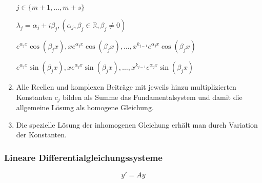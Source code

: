 \documentclass[twoside]{article}
\begin{document}
\begin{enumerate}[1.]
						\begin{math}
							j \in \{ m+1, \dots, m+s\}
						\end{math}
						
						\begin{math}
							\lambda_j = \alpha_j + i \beta_j, (\alpha_j, \beta_j \in \mathbb{R}, \beta_j \neq 0)
						\end{math}
						
						\begin{math}
							e^{\alpha_jx} \cos (\beta_jx), x e^{\alpha_jx} \cos (\beta_jx), \dots, x^{k_{j-1}} e^{\alpha_jx} \cos (\beta_jx)
						\end{math}
						
						\begin{math}
							e^{\alpha_jx} \sin (\beta_jx), x e^{\alpha_jx} \sin (\beta_jx), \dots, x^{k_{j-1}} e^{\alpha_jx} \sin (\beta_jx)
						\end{math}
						
					\item Alle Reellen und komplexen Beiträge mit jeweils hinzu multiplizierten Konstanten \begin{math} c_j \end{math} bilden als Summe das Fundamentalsystem und damit die allgemeine Lösung als homogene Gleichung.
					
					\item Die spezielle Lösung der inhomogenen Gleichung erhält man durch Variation der Konstanten.
				\end{enumerate}
				
			\subsubsection{Lineare Differentialgleichungssysteme}
				
				\begin{displaymath}
					y' = Ay
				\end{displaymath}
				
\end{document}
